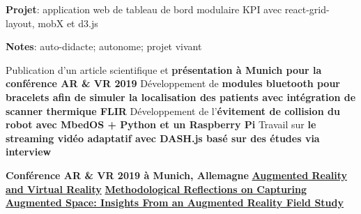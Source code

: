 \documentclass[10pt,a4paper,ragged2e,withhyper]{altacv}
\begin{document}
\divider

\textbf{Projet}: application web de tableau de bord modulaire KPI avec react-grid-layout, mobX et d3.js

\textbf{Notes}: auto-didacte; autonome; projet vivant

\newpage
{}
\begin{paracol}{2}

Publication d'un article scientifique et \textbf{présentation à Munich pour la conférence AR \& VR 2019}
\smallbreak
\divider
{}
Développement de \textbf{modules bluetooth pour bracelets afin de simuler la localisation des patients avec intégration de scanner thermique FLIR}
\smallbreak
\divider
{}
Développement de l'\textbf{évitement de collision du robot avec MbedOS + Python et un Raspberry Pi}
\smallbreak
\divider
{}
Travail sur \textbf{le streaming vidéo adaptatif avec DASH.js basé sur des études via interview}

\medskip
{}
\smallbreak
\textbf{Conférence AR \& VR 2019 à Munich, Allemagne}
\smallbreak
\smallbreak
{}
\smallbreak
\href{https://doi.org/10.1007/978-3-030-37869-1}{\textbf{Augmented Reality and Virtual Reality}}
\smallbreak
\href{https://www.cogitatiopress.com/mediaandcommunication/article/view/5316/2797}{\textbf{Methodological Reflections on Capturing Augmented Space: Insights From an Augmented Reality Field Study}}



\end{paracol}
\end{document}
